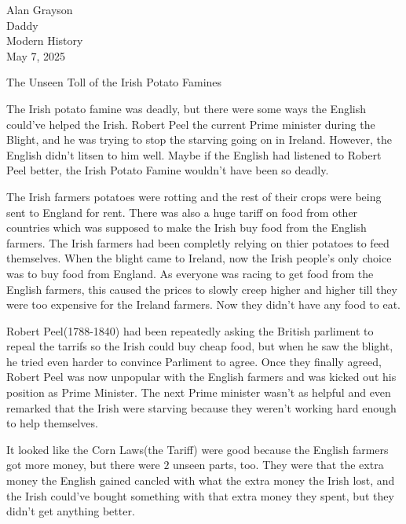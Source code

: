 \documentclass[12pt]{article}
\begin{document}
\begin{flushleft}

Alan Grayson\\
Daddy\\
Modern History\\
May 7, 2025\\


\begin{center}
The Unseen Toll of the Irish Potato Famines
\end{center}

\setlength{\parindent}{0.5in}

The Irish potato famine was deadly, but there were some ways the
English could've helped the Irish.  Robert Peel the current Prime
minister during the Blight, and he was trying to stop the starving
going on in Ireland. However, the English didn't litsen to him
well. Maybe if the English had listened to Robert Peel better, the
Irish Potato Famine wouldn't have been so deadly.


The Irish farmers potatoes were rotting and the rest of their crops
were being sent to England for rent. There was also a huge tariff on
food from other countries which was supposed to make the Irish buy
food from the English farmers. The Irish farmers had been completly
relying on thier potatoes to feed themselves. When the blight came to
Ireland, now the Irish people's only choice was to buy food from
England. As everyone was racing to get food from the English farmers,
this caused the prices to slowly creep higher and higher till they
were too expensive for the Ireland farmers. Now they didn't have any
food to eat.



Robert Peel(1788-1840) had been repeatedly asking the British
parliment to repeal the tarrifs so the Irish could buy cheap food, but
when he saw the blight, he tried even harder to convince Parliment to
agree.  Once they finally agreed, Robert Peel was now unpopular with
the English farmers and was kicked out his position as Prime
Minister. The next Prime minister wasn't as helpful and even remarked
that the Irish were starving because they weren't working hard enough
to help themselves.



It looked like the Corn Laws(the Tariff) were good because the English farmers got
more money, but there were $2$ unseen parts, too. They were that the
extra money the English gained cancled with what the extra money the Irish lost, and the
Irish could've bought something with that extra money they spent, but
they didn't get anything better.


\end{flushleft}
\end{document}
